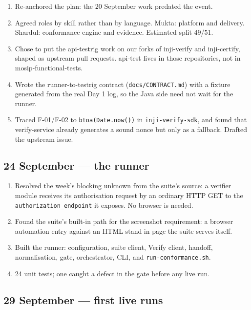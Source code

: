 \documentclass[10pt,a4paper]{article}
\newcommand{\tightlist}{\setlength{\itemsep}{1pt}\setlength{\parskip}{0pt}\setlength{\parsep}{0pt}}
\newcommand{\us}{\_}
\begin{document}
\begin{enumerate}\tightlist
  \item Re-anchored the plan: the 20 September work predated the event.
  \item Agreed roles by skill rather than by language. Mukta: platform and delivery.
        Shardul: conformance engine and evidence. Estimated split 49/51.
  \item Chose to put the api-testrig work on our forks of inji-verify and inji-certify,
        shaped as upstream pull requests. api-test lives in those repositories, not in
        mosip-functional-tests.
  \item Wrote the runner-to-testrig contract (\texttt{docs/CONTRACT.md}) with a fixture
        generated from the real Day 1 log, so the Java side need not wait for the runner.
  \item Traced F-01/F-02 to \texttt{btoa(Date.now())} in \texttt{inji-verify-sdk}, and
        found that verify-service already generates a sound nonce but only as a fallback.
        Drafted the upstream issue.
\end{enumerate}

\subsection{24 September --- the runner}

\begin{enumerate}\tightlist
  \item Resolved the week's blocking unknown from the suite's source: a verifier module
        receives its authorisation request by an ordinary HTTP GET to the
        \texttt{authorization\us{}endpoint} it exposes. No browser is needed.
  \item Found the suite's built-in path for the screenshot requirement: a browser
        automation entry against an HTML stand-in page the suite serves itself.
  \item Built the runner: configuration, suite client, Verify client, handoff,
        normalisation, gate, orchestrator, CLI, and \texttt{run-conformance.sh}.
  \item 24 unit tests; one caught a defect in the gate before any live run.
\end{enumerate}

\subsection{29 September --- first live runs}
\end{document}
